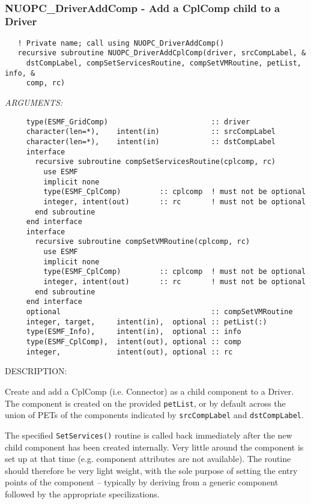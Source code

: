 \mbox{}\hrulefill\ 
 
\subsubsection [NUOPC\_DriverAddComp] {NUOPC\_DriverAddComp - Add a CplComp child to a Driver}


  
\begin{verbatim}   ! Private name; call using NUOPC_DriverAddComp()
   recursive subroutine NUOPC_DriverAddCplComp(driver, srcCompLabel, &
     dstCompLabel, compSetServicesRoutine, compSetVMRoutine, petList, info, &
     comp, rc)\end{verbatim}{\em ARGUMENTS:}
\begin{verbatim}     type(ESMF_GridComp)                        :: driver
     character(len=*),    intent(in)            :: srcCompLabel
     character(len=*),    intent(in)            :: dstCompLabel
     interface
       recursive subroutine compSetServicesRoutine(cplcomp, rc)
         use ESMF
         implicit none
         type(ESMF_CplComp)         :: cplcomp  ! must not be optional
         integer, intent(out)       :: rc       ! must not be optional
       end subroutine
     end interface
     interface
       recursive subroutine compSetVMRoutine(cplcomp, rc)
         use ESMF
         implicit none
         type(ESMF_CplComp)         :: cplcomp  ! must not be optional
         integer, intent(out)       :: rc       ! must not be optional
       end subroutine
     end interface
     optional                                   :: compSetVMRoutine
     integer, target,     intent(in),  optional :: petList(:)
     type(ESMF_Info),     intent(in),  optional :: info
     type(ESMF_CplComp),  intent(out), optional :: comp
     integer,             intent(out), optional :: rc \end{verbatim}
{\sf DESCRIPTION:\\ }


   Create and add a CplComp (i.e. Connector) as a child component to a Driver.
   The component is created on the provided {\tt petList}, or by default across 
   the union of PETs of the components indicated by {\tt srcCompLabel}
   and {\tt dstCompLabel}.
  
   The specified {\tt SetServices()} routine is called back immediately after the
   new child component has been created internally. Very little around the
   component is set up at that time (e.g. component attributes are not 
   available). The routine should therefore be very light weight, with the sole
   purpose of setting the entry points of the component -- typically by deriving 
   from a generic component followed by the appropriate specilizations.
  
